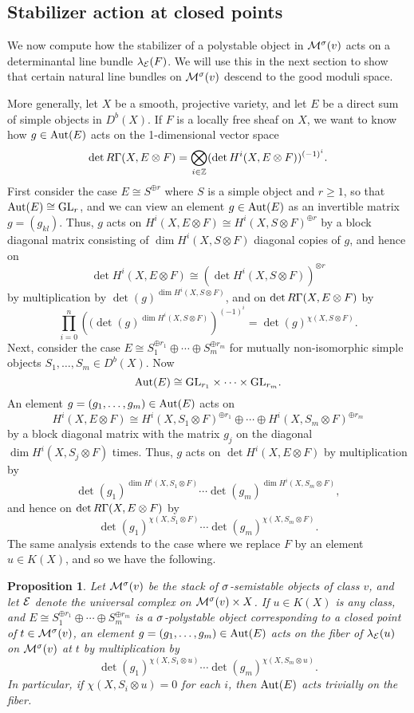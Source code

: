 \documentclass[letterpaper,11pt]{amsart}%
\newtheorem{prop}[thm]{Proposition}
\theoremstyle{remark}
\begin{document}
\subsection{Stabilizer action at closed points}
We now compute how the stabilizer of a polystable object in $\mathcal{M}^\sigma(v)$ acts on a determinantal line bundle $\lambda_{\mathcal{E}}(F)$. We will use this in the next section to show that certain natural line bundles on $\mathcal{M}^\sigma(v)$ descend to the good moduli space.

More generally, let $X$ be a smooth, projective variety, and let $E$ be a direct sum of simple objects in $D^b(X)$. If $F$ is a locally free sheaf on $X$, we want to know how $g \in \mathrm{Aut}(E)$ acts on the 1-dimensional vector space
\[ \det R \Gamma(X, E \otimes F) = \bigotimes_{i \in \mathbb{Z}} (\det H^i(X, E \otimes F))^{(-1)^i}. \]
First consider the case $E \cong S^{\oplus r}$ where $S$ is a simple object and $r \ge 1$, so that $\mathrm{Aut}(E) \cong \mathrm{GL}_r$, and we can view an element $g \in \mathrm{Aut}(E)$ as an invertible matrix $g = (g_{kl})$. Thus, $g$ acts on $H^i(X, E \otimes F) \cong H^i(X, S \otimes F)^{\oplus r}$ by a block diagonal matrix consisting of $\dim H^i(X, S \otimes F)$ diagonal copies of $g$, and hence on
\[ \det H^i(X, E \otimes F) \cong (\det H^i(X, S \otimes F))^{\otimes r} \]
by multiplication by $\det(g)^{\dim H^i(X, S \otimes F)}$, and on $\det R \Gamma(X, E \otimes F)$ by
\[ \prod_{i=0}^n \left((\det(g)^{\dim H^i(X, S \otimes F)}\right)^{(-1)^i} = \det(g)^{\chi(X, S \otimes F)}. \]
Next, consider the case $E \cong S_1^{\oplus r_1} \oplus \cdots \oplus S_m^{\oplus r_m}$ for mutually non-isomorphic simple objects $S_1, \ldots, S_m \in D^b(X)$. Now
\[ \mathrm{Aut}(E) \cong \mathrm{GL}_{r_1} \times \cdots \times \mathrm{GL}_{r_m}. \]
An element $g = (g_1, \ldots, g_m) \in \mathrm{Aut}(E)$ acts on
\[ H^i(X, E \otimes F) \cong H^i(X, S_1 \otimes F)^{\oplus r_1} \oplus \cdots \oplus H^i(X, S_m \otimes F)^{\oplus r_m} \]
by a block diagonal matrix with the matrix $g_j$ on the diagonal $\dim H^i(X, S_j \otimes F)$ times. Thus, $g$ acts on $\det H^i(X, E \otimes F)$ by multiplication by
\[ \det(g_1)^{\dim H^i(X, S_1 \otimes F)} \cdots \det(g_m)^{\dim H^i(X, S_m \otimes F)}, \]
and hence on $\det R \Gamma(X, E \otimes F)$ by
\[ \det(g_1)^{\chi(X, S_1 \otimes F)} \cdots \det(g_m)^{\chi(X, S_m \otimes F)}. \]
The same analysis extends to the case where we replace $F$ by an element $u \in K(X)$, and so we have the following.
\begin{prop}\label{lbtogms}
    Let $\mathcal{M}^\sigma(v)$ be the stack of $\sigma$-semistable objects of class $v$, and let $\mathcal{E}$ denote the universal complex on $\mathcal{M}^\sigma(v) \times X$. If $u \in K(X)$ is any class, and $E \cong S_1^{\oplus r_1} \oplus \cdots \oplus S_m^{\oplus r_m}$ is a $\sigma$-polystable object corresponding to a closed point of $t \in \mathcal{M}^\sigma(v)$, an element $g = (g_1,\ldots,g_m) \in \mathrm{Aut}(E)$ acts on the fiber of $\lambda_{\mathcal{E}}(u)$ on $\mathcal{M}^\sigma(v)$ at $t$ by multiplication by
    \[ \det(g_1)^{\chi(X, S_1 \otimes u)} \cdots \det(g_m)^{\chi(X, S_m \otimes u)}. \]
    In particular, if $\chi(X, S_i \otimes u) = 0$ for each $i$, then $\mathrm{Aut}(E)$ acts trivially on the fiber.
\end{prop}
\end{document}
